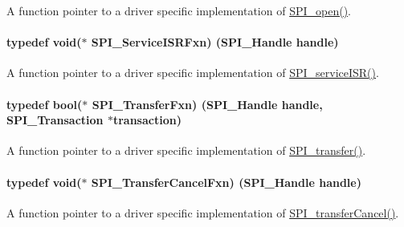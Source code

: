 A function pointer to a driver specific implementation of \hyperlink{_s_p_i_8h_a62cfe494cb1df47cd602e8747e894fd1}{S\+P\+I\+\_\+open()}. 

\paragraph[{S\+P\+I\+\_\+\+Service\+I\+S\+R\+Fxn}]{\setlength{\rightskip}{0pt plus 5cm}typedef void($\ast$ S\+P\+I\+\_\+\+Service\+I\+S\+R\+Fxn) ({\bf S\+P\+I\+\_\+\+Handle} handle)}\label{_s_p_i_8h_aeb15890517783b3b646a36a76dbe2070}


A function pointer to a driver specific implementation of \hyperlink{_s_p_i_8h_aa6f1baa732ebbf0aa7cd5c3f7dfd215a}{S\+P\+I\+\_\+service\+I\+S\+R()}. 

\paragraph[{S\+P\+I\+\_\+\+Transfer\+Fxn}]{\setlength{\rightskip}{0pt plus 5cm}typedef bool($\ast$ S\+P\+I\+\_\+\+Transfer\+Fxn) ({\bf S\+P\+I\+\_\+\+Handle} handle, {\bf S\+P\+I\+\_\+\+Transaction} $\ast$transaction)}\label{_s_p_i_8h_a470d264d053b30edb0aaafcafd335c26}


A function pointer to a driver specific implementation of \hyperlink{_s_p_i_8h_a989e17f96b54fcc3dc2cac5f8ac6bdb2}{S\+P\+I\+\_\+transfer()}. 

\paragraph[{S\+P\+I\+\_\+\+Transfer\+Cancel\+Fxn}]{\setlength{\rightskip}{0pt plus 5cm}typedef void($\ast$ S\+P\+I\+\_\+\+Transfer\+Cancel\+Fxn) ({\bf S\+P\+I\+\_\+\+Handle} handle)}\label{_s_p_i_8h_a33f5b214451ac89ea462083eeba0bf8c}


A function pointer to a driver specific implementation of \hyperlink{_s_p_i_8h_a6819f7761fc3505c4f885653ff8121f0}{S\+P\+I\+\_\+transfer\+Cancel()}. 

